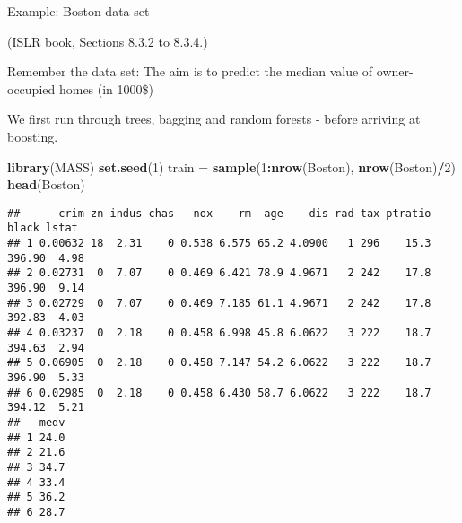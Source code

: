 \documentclass[10pt,ignorenonframetext,]{beamer}
\newenvironment{Shaded}{\begin{snugshade}}{\end{snugshade}}
\newcommand{\DecValTok}[1]{\textcolor[rgb]{0.00,0.00,0.81}{#1}}
\newcommand{\KeywordTok}[1]{\textcolor[rgb]{0.13,0.29,0.53}{\textbf{#1}}}
\newcommand{\NormalTok}[1]{#1}
\newcommand{\OperatorTok}[1]{\textcolor[rgb]{0.81,0.36,0.00}{\textbf{#1}}}
\newcommand{\StringTok}[1]{\textcolor[rgb]{0.31,0.60,0.02}{#1}}
\begin{document}
\begin{frame}[fragile]{Example: Boston data set}
\protect\hypertarget{example-boston-data-set}{}

\tiny

(ISLR book, Sections 8.3.2 to 8.3.4.)

\normalsize

Remember the data set: The aim is to predict the median value of
owner-occupied homes (in 1000\$)

We first run through trees, bagging and random forests - before arriving
at boosting.

\scriptsize

\begin{Shaded}
\begin{Highlighting}[]
\KeywordTok{library}\NormalTok{(MASS)}
\KeywordTok{set.seed}\NormalTok{(}\DecValTok{1}\NormalTok{)}
\NormalTok{train =}\StringTok{ }\KeywordTok{sample}\NormalTok{(}\DecValTok{1}\OperatorTok{:}\KeywordTok{nrow}\NormalTok{(Boston), }\KeywordTok{nrow}\NormalTok{(Boston)}\OperatorTok{/}\DecValTok{2}\NormalTok{)}
\KeywordTok{head}\NormalTok{(Boston)}
\end{Highlighting}
\end{Shaded}

\begin{verbatim}
##      crim zn indus chas   nox    rm  age    dis rad tax ptratio  black lstat
## 1 0.00632 18  2.31    0 0.538 6.575 65.2 4.0900   1 296    15.3 396.90  4.98
## 2 0.02731  0  7.07    0 0.469 6.421 78.9 4.9671   2 242    17.8 396.90  9.14
## 3 0.02729  0  7.07    0 0.469 7.185 61.1 4.9671   2 242    17.8 392.83  4.03
## 4 0.03237  0  2.18    0 0.458 6.998 45.8 6.0622   3 222    18.7 394.63  2.94
## 5 0.06905  0  2.18    0 0.458 7.147 54.2 6.0622   3 222    18.7 396.90  5.33
## 6 0.02985  0  2.18    0 0.458 6.430 58.7 6.0622   3 222    18.7 394.12  5.21
##   medv
## 1 24.0
## 2 21.6
## 3 34.7
## 4 33.4
## 5 36.2
## 6 28.7
\end{verbatim}

\end{frame}
\end{document}

